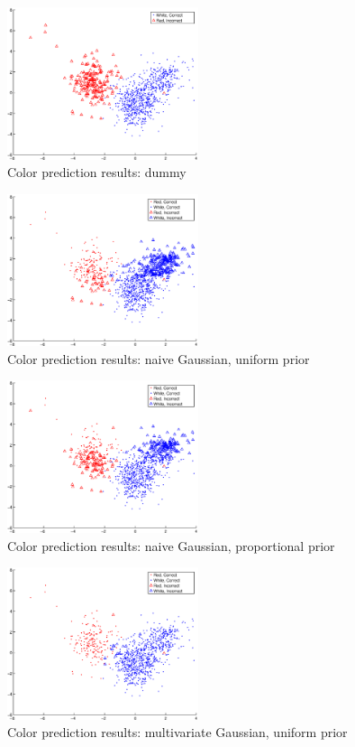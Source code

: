 \documentclass[twoside]{article}
\begin{document}
\begin{multicols}{2}
\begin{figure}[H]
\centering
\includegraphics[width=0.5\textwidth]{colorpca/dummy}
\caption{Color prediction results: dummy}
\end{figure}

\begin{figure}[H]
\centering
\includegraphics[width=0.5\textwidth]{colorpca/naive_noprior}
\caption{Color prediction results: naive Gaussian, uniform prior}
\end{figure}

\begin{figure}[H]
\centering
\includegraphics[width=0.5\textwidth]{colorpca/naive_prior}
\caption{Color prediction results: naive Gaussian, proportional prior}
\end{figure}

\begin{figure}[H]
\centering
\includegraphics[width=0.5\textwidth]{colorpca/gauss_noprior}
\caption{Color prediction results: multivariate Gaussian, uniform prior}
\end{figure}


\end{multicols}
\end{document}
